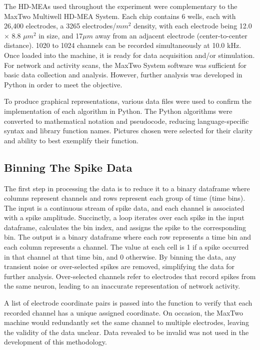 \documentclass{article} %
\begin{document}
The HD-MEAs used throughout the experiment were complementary to the MaxTwo Multiwell HD-MEA System. Each chip contains 6 wells, each with 26,400 electrodes, a 3265 electrodes/\(mm^2\) density, with each electrode being 12.0 \(\times\) 8.8 \(\mu{m}^2\) in size, and 17\(\mu{m}\) away from an adjacent electrode (center-to-center distance). 1020 to 1024 channels can be recorded simultaneously at 10.0 kHz. Once loaded into the machine, it is ready for data acquisition and/or stimulation. For network and activity scans, the MaxTwo System software was sufficient for basic data collection and analysis. However, further analysis was developed in Python in order to meet the objective.

To produce graphical representations, various data files were used to confirm the implementation of each algorithm in Python. The Python algorithms were converted to mathematical notation and pseudocode, reducing language-specific syntax and library function names. Pictures chosen were selected for their clarity and ability to best exemplify their function.

\subsection{Binning The Spike Data}

The first step in processing the data is to reduce it to a binary dataframe where columns represent channels and rows represent each group of time (time bins). The input is a continuous stream of spike data, and each channel is associated with a spike amplitude. Succinctly, a loop iterates over each spike in the input dataframe, calculates the bin index, and assigns the spike to the corresponding bin. The output is a binary dataframe where each row represents a time bin and each column represents a channel. The value at each cell is 1 if a spike occurred in that channel at that time bin, and 0 otherwise. By binning the data, any transient noise or over-selected spikes are removed, simplifying the data for further analysis. Over-selected channels refer to electrodes that record spikes from the same neuron, leading to an inaccurate representation of network activity.

A list of electrode coordinate pairs is passed into the function to verify that each recorded channel has a unique assigned coordinate. On occasion, the MaxTwo machine would redundantly set the same channel to multiple electrodes, leaving the validity of the data unclear. Data revealed to be invalid was not used in the development of this methodology.
\end{document}

